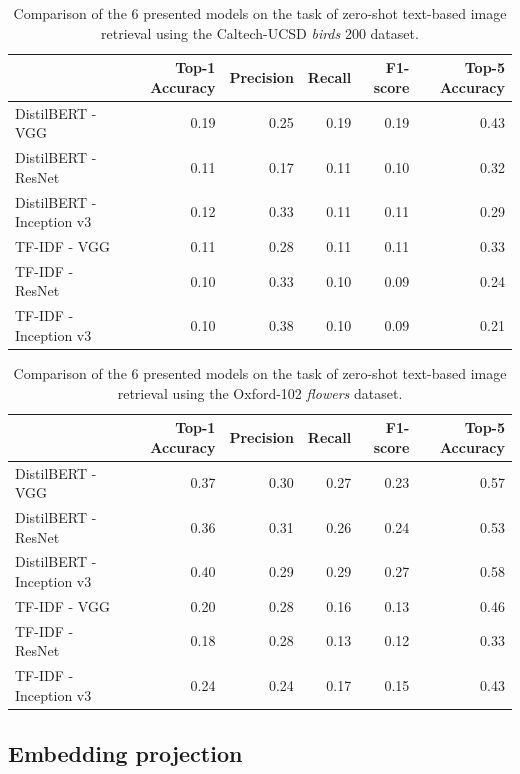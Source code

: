 \begin{table}
\def\arraystretch{1.25}
\centering
\caption{Comparison of the 6 presented models on the task of zero-shot text-based image retrieval using the Caltech-UCSD \textit{birds} 200 \cite{welinder2010caltech} dataset.}
\label{table:birds}
\begin{tabular}{|l|r|r|r|r|r|}\hline
    & Top-1 Accuracy & Precision & Recall & F1-score & Top-5 Accuracy \\\hline
   DistilBERT - VGG & 0.19& 0.25& 0.19& 0.19& 0.43\\\hline
   DistilBERT - ResNet & 0.11& 0.17& 0.11& 0.10& 0.32\\\hline
   DistilBERT - Inception v3 & 0.12& 0.33& 0.11& 0.11& 0.29\\\hline
   TF-IDF - VGG & 0.11& 0.28& 0.11& 0.11& 0.33\\\hline
   TF-IDF - ResNet & 0.10& 0.33& 0.10& 0.09& 0.24\\\hline
   TF-IDF - Inception v3 & 0.10& 0.38& 0.10& 0.09& 0.21\\\hline
   \end{tabular}
\end{table}


\begin{table}
\vspace{2cm}
\def\arraystretch{1.25}
\centering
\caption{Comparison of the 6 presented models on the task of zero-shot text-based image retrieval using the Oxford-102 \textit{flowers} \cite{Nilsback08} dataset.}
\label{table:flowers}
\begin{tabular}{|l|r|r|r|r|r|}\hline
     & Top-1 Accuracy & Precision & Recall & F1-score & Top-5 Accuracy \\\hline
    DistilBERT - VGG & 0.37& 0.30& 0.27& 0.23& 0.57\\\hline
    DistilBERT - ResNet & 0.36& 0.31& 0.26& 0.24& 0.53\\\hline
    DistilBERT - Inception v3 & 0.40& 0.29& 0.29& 0.27& 0.58\\\hline
    TF-IDF - VGG & 0.20& 0.28& 0.16& 0.13& 0.46\\\hline
    TF-IDF - ResNet & 0.18& 0.28& 0.13& 0.12& 0.33\\\hline
    TF-IDF - Inception v3 & 0.24& 0.24& 0.17& 0.15& 0.43\\\hline
\end{tabular}
\vspace{1.5cm}
\end{table}

\subsection{Embedding projection}

